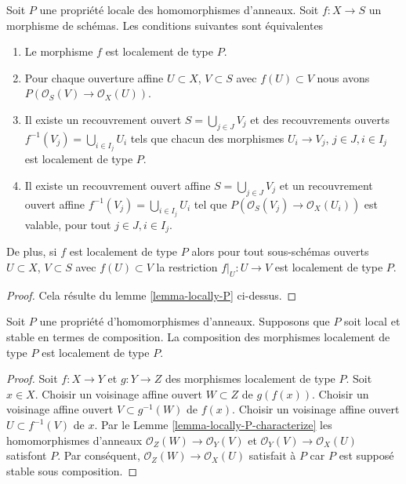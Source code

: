\begin{lemma}
\label{lemma-locally-P-characterize}
Soit $P$ une propriété locale des homomorphismes
d'anneaux. Soit $f : X \to S$ un morphisme de schémas. Les conditions
suivantes sont équivalentes
\begin{enumerate}
\item Le morphisme $f$ est localement de type $P$.
\item Pour chaque ouverture affine $U \subset X$,
$V \subset S$ avec $f(U) \subset V$ nous avons $P(\mathcal{O}_S(V) \to \mathcal{O}_X(U))$.
\item Il existe un recouvrement ouvert $S = \bigcup_{j \in J} V_j$ et des
recouvrements ouverts $f^{-1}(V_j) = \bigcup_{i \in I_j} U_i$ tels que chacun des
morphismes $U_i \to V_j$, $j\in J, i\in I_j$ est localement de
type $P$.
\item Il existe un recouvrement ouvert affine $S = \bigcup_{j \in J} V_j$
et un recouvrement ouvert affine $f^{-1}(V_j) = \bigcup_{i \in I_j} U_i$
tel que $P(\mathcal{O}_S(V_j) \to \mathcal{O}_X(U_i))$ est valable, pour tout
$j\in J, i\in I_j$.
\end{enumerate}
De plus, si $f$ est localement de type $P$
alors pour tout sous-schémas ouverts $U \subset X$, $V \subset S$ avec $f(U) \subset V$
la restriction $f|_U : U \to V$ est localement de type $P$.
\end{lemma}

\begin{proof}
Cela résulte du lemme \ref{lemma-locally-P} ci-dessus.
\end{proof}

\begin{lemma}
\label{lemma-composition-type-P}
Soit $P$ une propriété d'homomorphismes d'anneaux.
Supposons que $P$ soit local et stable en termes de composition.
La composition des morphismes localement de type $P$ est localement
de type $P$.
\end{lemma}

\begin{proof}
Soit $f : X \to Y$ et $g : Y \to Z$ des morphismes localement de type
$P$. Soit $x \in X$. Choisir un voisinage affine
ouvert $W \subset Z$ de $g(f(x))$. Choisir un voisinage affine
ouvert $V \subset g^{-1}(W)$ de $f(x)$. Choisir un voisinage affine
ouvert $U \subset f^{-1}(V)$ de $x$. Par le Lemme \ref{lemma-locally-P-characterize} les
homomorphismes d'anneaux $\mathcal{O}_Z(W) \to \mathcal{O}_Y(V)$ et
$\mathcal{O}_Y(V) \to \mathcal{O}_X(U)$ satisfont $P$. Par conséquent,
$\mathcal{O}_Z(W) \to \mathcal{O}_X(U)$ satisfait à $P$ car $P$
est supposé stable sous composition.
\end{proof}


